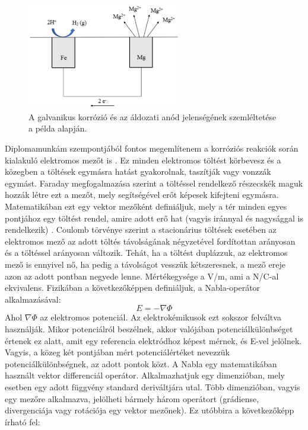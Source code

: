 \begin{figure}
\centering
\includegraphics[width=0.6\textwidth]{img/corrosion.eps}
\caption{A galvanikus korrózió és az áldozati anód jelenségének szemléltetése a példa alapján.}
\label{fig:corrosion}
\end{figure}

Diplomamunkám szempontjából fontos megemlítenem a korróziós reakciók során kialakuló elektromos mezőt is \cite{morley1994principles}. Ez minden elektromos töltést körbevesz és a közegben a töltések egymásra hatást gyakorolnak, taszítják vagy vonzzák egymást. Faraday megfogalmazása szerint a töltéssel rendelkező részecskék maguk hozzák létre ezt a mezőt, mely segítségével erőt képesek kifejteni egymásra. Matematikában ezt egy vektor mezőként definiáljuk, mely a tér minden egyes pontjához egy töltést rendel, amire adott erő hat (vagyis iránnyal és nagysággal is rendelkezik) \cite{purcell2013electricity}. Coulomb törvénye szerint a stacionárius töltések esetében az elektromos mező az adott töltés távolságának négyzetével fordítottan arányosan és a töltéssel arányosan változik. Tehát, ha a töltést duplázzuk, az elektromos mező is ennyivel nő, ha pedig a távolságot vesszük kétszeresnek, a mező ereje azon az adott pontban negyede lenne. Mértékegysége a V/m, ami a N/C-al ekvivalens. Fizikában a következőképpen definiáljuk, a Nabla-operátor alkalmazásával:
\begin{equation}
{E} = - \nabla \Phi
\label{eq:field}
\end{equation}
Ahol $\nabla \Phi$ az elektromos potenciál. Az elektrokémikusok ezt sokszor felváltva használják. Mikor potenciálról beszélnek, akkor valójában potenciálkülönbséget értenek ez alatt, amit egy referencia elektródhoz képest mérnek, és E-vel jelölnek. Vagyis, a közeg két pontjában mért potenciálértéket nevezzük potenciálkülönbségnek, az adott pontok közt. A Nabla egy matematikában használt vektor differenciál operátor. Alkalmazhatjuk egy dimenzióban, mely esetben egy adott függvény standard deriváltjára utal. Több dimenzióban, vagyis egy mezőre alkalmazva, jelölheti bármely három operátort (grádiense, divergenciája vagy rotációja egy vektor mezőnek). Ez utóbbira a következőképp írható fel:

